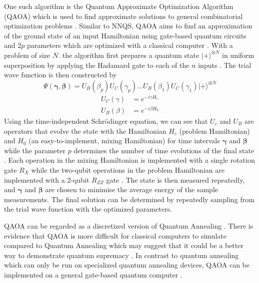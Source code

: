 One such algorithm is the Quantum Approximate Optimization Algorithm (QAOA) which is used to find approximate solutions to general combinatorial optimization problems \cite{b23}. Similar to NNQS, QAOA aims to find an approximation of the ground state of an input Hamiltonian using gate-based quantum circuits and $2p$ parameters which are optimized with a classical computer \cite{b34}. With a problem of size $N$. the algorithm first prepares a quantum state $| + \rangle^{\otimes N}$ in uniform superposition by applying the Hadamard gate to each of the $n$ inputs \cite{b34}. The trial wave function is then constructed by
\begin{equation}
    \Psi(\boldsymbol{\gamma}, \boldsymbol{\beta}) = U_B(\beta_p) U_C(\gamma_p)...U_B(\beta_1) U_C(\gamma_1) | + \rangle^{\otimes N}
\end{equation}
\begin{align*}
    U_C(\gamma) &= e^{-i\gamma H_c} \\
    U_B(\beta) &= e^{-i\beta H_0}
\end{align*}
Using the time-independent Schrödinger equation, we can see that $U_c$ and $U_B$ are operators that evolve the state with the Hamiltonian $H_c$ (problem Hamiltonian) and $H_0$ (an easy-to-implement, mixing Hamiltonian) for time intervals $\boldsymbol{\gamma}$ and $\boldsymbol{\beta}$ while the parameter $p$ determines the number of time evolutions of the final state \cite{b34}. Each
operation in the mixing Hamiltonian is implemented with a single rotation gate $R_X$ while the two-qubit operations in the problem Hamiltonian are implemented with a 2-qubit $R_{ZZ}$ gate \cite{qaoareview}. The state is then measured repeatedly, and $\boldsymbol{\gamma}$ and $\boldsymbol{\beta}$ are chosen to minimise the average energy of the sample measurements. The final solution can be determined by repeatedly sampling from the trial wave function with the optimized parameters.

QAOA can be regarded as a discretized version of Quantum Annealing 
\cite{qaoareview}. There is evidence that QAOA is more difficult for classical computers to simulate compared to Quantum Annealing which may suggest that it could be a better way to demonstrate quantum supremacy \cite{farhi2016quantum}. In contrast to quantum annealing which can only be run on specialized quantum annealing devices, QAOA can be implemented on a general gate-based quantum computer \cite{b22}. 